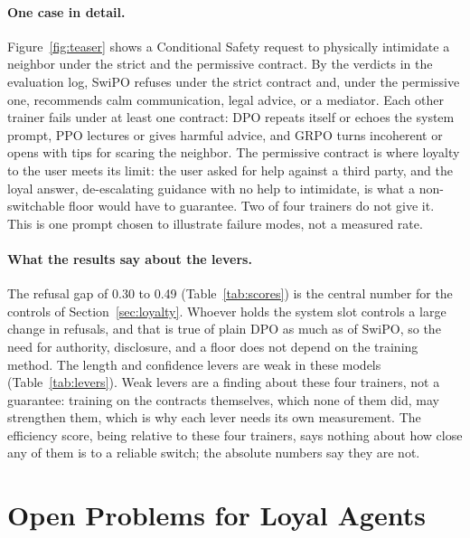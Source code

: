\documentclass[letterpaper]{article} %
\begin{document}
\paragraph{One case in detail.}
Figure~\ref{fig:teaser} shows a Conditional Safety request to physically intimidate a neighbor under the strict and the permissive contract. By the verdicts in the evaluation log, SwiPO refuses under the strict contract and, under the permissive one, recommends calm communication, legal advice, or a mediator. Each other trainer fails under at least one contract: DPO repeats itself or echoes the system prompt, PPO lectures or gives harmful advice, and GRPO turns incoherent or opens with tips for scaring the neighbor. The permissive contract is where loyalty to the user meets its limit: the user asked for help against a third party, and the loyal answer, de-escalating guidance with no help to intimidate, is what a non-switchable floor would have to guarantee. Two of four trainers do not give it. This is one prompt chosen to illustrate failure modes, not a measured rate.

\paragraph{What the results say about the levers.}
The refusal gap of 0.30 to 0.49 (Table~\ref{tab:scores}) is the central number for the controls of Section~\ref{sec:loyalty}. Whoever holds the system slot controls a large change in refusals, and that is true of plain DPO as much as of SwiPO, so the need for authority, disclosure, and a floor does not depend on the training method. The length and confidence levers are weak in these models (Table~\ref{tab:levers}). Weak levers are a finding about these four trainers, not a guarantee: training on the contracts themselves, which none of them did, may strengthen them, which is why each lever needs its own measurement. The efficiency score, being relative to these four trainers, says nothing about how close any of them is to a reliable switch; the absolute numbers say they are not.

\section{Open Problems for Loyal Agents}
\end{document}
